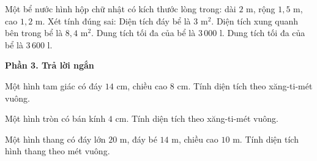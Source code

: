 \begin{ex} %
Một bể nước hình hộp chữ nhật có kích thước lòng trong: dài $2\text{ m}$, rộng $1{,}5\text{ m}$, cao $1{,}2\text{ m}$. Xét tính đúng sai:
\choiceTF
{\True Diện tích đáy bể là $3\text{ m}^2$.}
{\True Diện tích xung quanh bên trong bể là $8{,}4\text{ m}^2$.}
{Dung tích tối đa của bể là $3\,000\text{ l}$.}
{\True Dung tích tối đa của bể là $3\,600\text{ l}$.}
\end{ex}

\textbf{Phần 3. Trả lời ngắn}

\begin{ex} %
Một hình tam giác có đáy $14\text{ cm}$, chiều cao $8\text{ cm}$. Tính diện tích theo xăng-ti-mét vuông.
\end{ex}

\begin{ex} %
Một hình tròn có bán kính $4\text{ cm}$. Tính diện tích theo xăng-ti-mét vuông.
\end{ex}

\begin{ex} %
Một hình thang có đáy lớn $20\text{ m}$, đáy bé $14\text{ m}$, chiều cao $10\text{ m}$. Tính diện tích hình thang theo mét vuông.
\end{ex}

